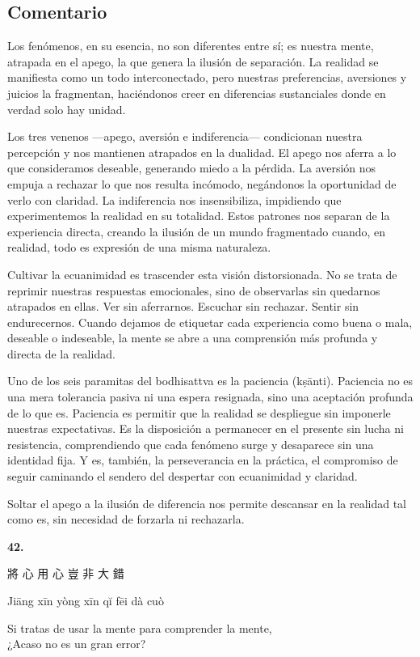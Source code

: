 \documentclass[
  a5paperpaper,
]{article}
\begin{document}
\hfill\break

\hypertarget{comentario-40}{%
\subsection{Comentario}\label{comentario-40}}

Los fenómenos, en su esencia, no son diferentes entre sí; es nuestra
mente, atrapada en el apego, la que genera la ilusión de separación. La
realidad se manifiesta como un todo interconectado, pero nuestras
preferencias, aversiones y juicios la fragmentan, haciéndonos creer en
diferencias sustanciales donde en verdad solo hay unidad.

Los tres venenos ---apego, aversión e indiferencia--- condicionan
nuestra percepción y nos mantienen atrapados en la dualidad. El apego
nos aferra a lo que consideramos deseable, generando miedo a la pérdida.
La aversión nos empuja a rechazar lo que nos resulta incómodo,
negándonos la oportunidad de verlo con claridad. La indiferencia nos
insensibiliza, impidiendo que experimentemos la realidad en su
totalidad. Estos patrones nos separan de la experiencia directa, creando
la ilusión de un mundo fragmentado cuando, en realidad, todo es
expresión de una misma naturaleza.

Cultivar la ecuanimidad es trascender esta visión distorsionada. No se
trata de reprimir nuestras respuestas emocionales, sino de observarlas
sin quedarnos atrapados en ellas. Ver sin aferrarnos. Escuchar sin
rechazar. Sentir sin endurecernos. Cuando dejamos de etiquetar cada
experiencia como buena o mala, deseable o indeseable, la mente se abre a
una comprensión más profunda y directa de la realidad.

Uno de los seis paramitas del bodhisattva es la paciencia (kṣānti).
Paciencia no es una mera tolerancia pasiva ni una espera resignada, sino
una aceptación profunda de lo que es. Paciencia es permitir que la
realidad se despliegue sin imponerle nuestras expectativas. Es la
disposición a permanecer en el presente sin lucha ni resistencia,
comprendiendo que cada fenómeno surge y desaparece sin una identidad
fija. Y es, también, la perseverancia en la práctica, el compromiso de
seguir caminando el sendero del despertar con ecuanimidad y claridad.

Soltar el apego a la ilusión de diferencia nos permite descansar en la
realidad tal como es, sin necesidad de forzarla ni rechazarla.

\hfill\break

\hypertarget{02}{}
\begin{verseblock}

\newpage

\begin{center}\textbf{42.}\end{center}

將 心 用 心 豈 非 大 錯

Jiāng xīn yòng xīn qĭ fēi dà cuò

Si tratas de usar la mente para comprender la mente,\\
¿Acaso no es un gran error?

\end{verseblock}
\end{document}
